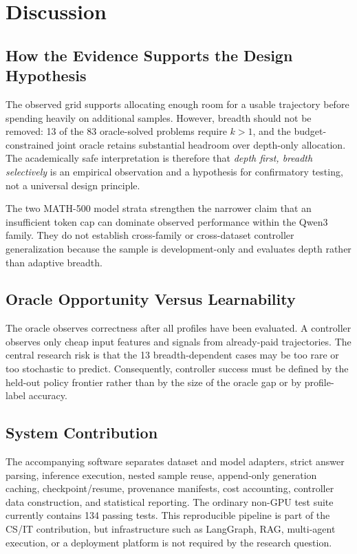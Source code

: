 \documentclass[runningheads]{llncs}
\begin{document}
\section{Discussion}

\subsection{How the Evidence Supports the Design Hypothesis}

The observed grid supports allocating enough room for a usable trajectory before
spending heavily on additional samples. However, breadth should not be removed:
13 of the 83 oracle-solved problems require $k>1$, and the budget-constrained
joint oracle retains substantial headroom over depth-only allocation. The
academically safe interpretation is therefore that \emph{depth first, breadth
selectively} is an empirical observation and a hypothesis for confirmatory
testing, not a universal design principle.

The two MATH-500 model strata strengthen the narrower claim that an
insufficient token cap can dominate observed performance within the Qwen3
family. They do not establish cross-family or cross-dataset controller
generalization because the sample is development-only and evaluates depth
rather than adaptive breadth.

\subsection{Oracle Opportunity Versus Learnability}

The oracle observes correctness after all profiles have been evaluated. A
controller observes only cheap input features and signals from already-paid
trajectories. The central research risk is that the 13 breadth-dependent cases
may be too rare or too stochastic to predict. Consequently, controller success
must be defined by the held-out policy frontier rather than by the size of the
oracle gap or by profile-label accuracy.

\subsection{System Contribution}

The accompanying software separates dataset and model adapters, strict answer
parsing, inference execution, nested sample reuse, append-only generation
caching, checkpoint/resume, provenance manifests, cost accounting, controller
data construction, and statistical reporting. The ordinary non-GPU test suite
currently contains 134 passing tests. This reproducible pipeline is part of the
CS/IT contribution, but infrastructure such as LangGraph, RAG, multi-agent
execution, or a deployment platform is not required by the research question.
\end{document}
